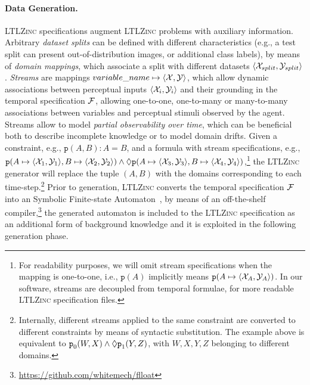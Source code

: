 \paragraph{Data Generation.} \textsc{LTLZinc} specifications augment \textsc{LTLZinc} problems with auxiliary information.
Arbitrary \textit{dataset splits} can be defined with different characteristics (e.g., a test split can present out-of-distribution images, or additional class labels), by means of \textit{domain mappings}, which associate a split with different datasets $\langle {\mathcal{X}}_{split}, {\mathcal{Y}}_{split}\rangle$.
\textit{Streams} are mappings $variable\_name \mapsto \langle {\mathcal{X}}, {\mathcal{Y}} \rangle$, which allow dynamic associations between perceptual inputs $\langle {\mathcal{X}}_i, {\mathcal{Y}}_i \rangle$ and their grounding in the temporal specification ${\mathcal{F}}$, allowing one-to-one, one-to-many or many-to-many associations between variables and perceptual stimuli observed by the agent. Streams allow to model \textit{partial observability over time}, which can be beneficial both to describe incomplete knowledge or to model domain drifts. Given a constraint, e.g., $\texttt{p}(A,B): A = B$, and a formula with stream specifications, e.g., $\texttt{p}(A \mapsto \langle{\mathcal{X}}_1, {\mathcal{Y}}_1\rangle, B \mapsto \langle{\mathcal{X}}_2, {\mathcal{Y}}_2\rangle) \wedge \Diamond \texttt{p}(A \mapsto \langle{\mathcal{X}}_3, {\mathcal{Y}}_3\rangle, B \mapsto \langle{\mathcal{X}}_4, {\mathcal{Y}}_4\rangle)$,\footnote{For readability purposes, we will omit stream specifications when the mapping is one-to-one, i.e., $\texttt{p}(A)$ implicitly means $\texttt{p}(A\mapsto\langle{\mathcal{X}}_A, {\mathcal{Y}}_A\rangle)$. In our software, streams are decoupled from temporal formulae, for more readable \textsc{LTLZinc} specification files.} the \textsc{LTLZinc} generator will replace the tuple $(A,B)$ with the domains corresponding to each time-step.\footnote{Internally, different streams applied to the same constraint are converted to different constraints by means of syntactic substitution. The example above is equivalent to $\texttt{p}_0(W,X) \wedge \Diamond \texttt{p}_1(Y,Z)$, with $W,X,Y,Z$ belonging to different domains.}
Prior to generation, \textsc{LTLZinc} converts the temporal specification ${\mathcal{F}}$ into an Symbolic Finite-state Automaton~\cite{veanes2010symbolic}, by means of an off-the-shelf compiler,\footnote{\url{https://github.com/whitemech/flloat}} the generated automaton is included to the \textsc{LTLZinc} specification as an additional form of background knowledge and it is exploited in the following generation phase.


